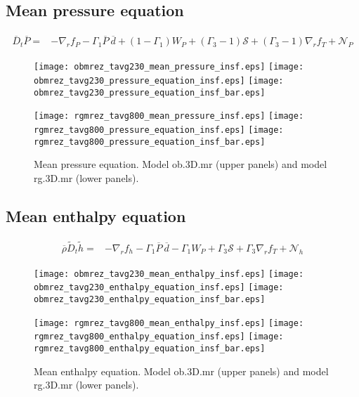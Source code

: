 \documentclass[10pt,paper=a4]{report}
\newcommand{\eht}{\overline}
\newcommand{\fav}{\widetilde}
\newcommand{\av}{\overline}
\def\erho{\eht{\rho}}
\begin{document}
\newpage

\subsection{Mean pressure equation}

\begin{align}
\av{D}_t \av{P} = & -\nabla_r f_P - \Gamma_1 \eht{P} \ \eht{d} + (1 -\Gamma_1) W_P + (\Gamma_3 -1){\mathcal S} + (\Gamma_3 - 1)\nabla_r f_T + {\mathcal N_P}
\end{align}

\begin{figure}[!h]
\centerline{
\texttt{[image: obmrez\_tavg230\_mean\_pressure\_insf.eps]}
\texttt{[image: obmrez\_tavg230\_pressure\_equation\_insf.eps]}
\texttt{[image: obmrez\_tavg230\_pressure\_equation\_insf\_bar.eps]}}

\centerline{
\texttt{[image: rgmrez\_tavg800\_mean\_pressure\_insf.eps]}                      
\texttt{[image: rgmrez\_tavg800\_pressure\_equation\_insf.eps]}     
\texttt{[image: rgmrez\_tavg800\_pressure\_equation\_insf\_bar.eps]}}
\caption{Mean pressure equation. Model {\sf ob.3D.mr} (upper panels) and model {\sf rg.3D.mr} (lower panels). \label{fig:pp-equation}}
\end{figure}

\newpage

\subsection{Mean enthalpy equation}

\begin{align}
\erho\fav{D}_t \fav{h} = & -\nabla_r f_h - \Gamma_1\eht{P} \ \eht{d} - \Gamma_1 W_P + \Gamma_3 {\mathcal S} + \Gamma_3 \nabla_r f_T +  {\mathcal N_h} \label{eq:rans_h}
\end{align}

\begin{figure}[!h]
\centerline{
\texttt{[image: obmrez\_tavg230\_mean\_enthalpy\_insf.eps]}
\texttt{[image: obmrez\_tavg230\_enthalpy\_equation\_insf.eps]}
\texttt{[image: obmrez\_tavg230\_enthalpy\_equation\_insf\_bar.eps]}}

\centerline{
\texttt{[image: rgmrez\_tavg800\_mean\_enthalpy\_insf.eps]}                      
\texttt{[image: rgmrez\_tavg800\_enthalpy\_equation\_insf.eps]}     
\texttt{[image: rgmrez\_tavg800\_enthalpy\_equation\_insf\_bar.eps]}}
\caption{Mean enthalpy equation. Model {\sf ob.3D.mr} (upper panels) and model {\sf rg.3D.mr} (lower panels). \label{fig:hh-equation}}
\end{figure}
\end{document}
